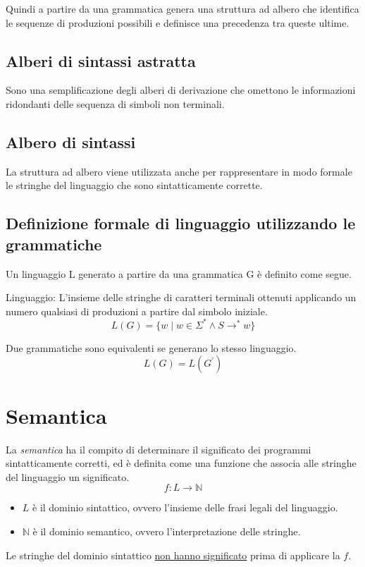 \documentclass{article}
\begin{document}
Quindi a partire da una grammatica genera una struttura ad albero che identifica le sequenze di produzioni possibili e definisce una precedenza tra queste ultime.

\subsection{Alberi di sintassi astratta}
Sono una semplificazione degli alberi di derivazione che omettono le informazioni ridondanti delle sequenza di simboli non terminali.

\subsection{Albero di sintassi}
La struttura ad albero viene utilizzata anche per rappresentare in modo formale le stringhe del linguaggio che sono sintatticamente corrette.

\subsection{Definizione formale di linguaggio utilizzando le grammatiche}
Un linguaggio L generato a partire da una grammatica G è definito come segue.
\begin{dfn}{Linguaggio:}
    L'insieme delle stringhe di caratteri terminali ottenuti applicando un numero qualsiasi di produzioni a partire dal simbolo iniziale.
    \[L(G) = \{ w \mid w \in \Sigma^* \land S \rightarrow^* w\}\]
\end{dfn}
\noindent Due grammatiche sono equivalenti se generano lo stesso linguaggio.
\[L(G) = L(G^\prime)\]

\pagebreak

\section{Semantica}
La \emph{semantica} ha il compito di determinare il significato dei programmi sintatticamente corretti, ed è definita come una funzione che associa alle stringhe del linguaggio un significato.
\[f: L \rightarrow \mathbb{N}\]
\begin{itemize}
    \item \(L\) è il dominio sintattico, ovvero l'insieme delle frasi legali del linguaggio.
    \item \(\mathbb{N}\) è il dominio semantico, ovvero l'interpretazione delle stringhe.
\end{itemize}
Le stringhe del dominio sintattico \underline{non hanno significato} prima di applicare la \(f\).
\end{document}
